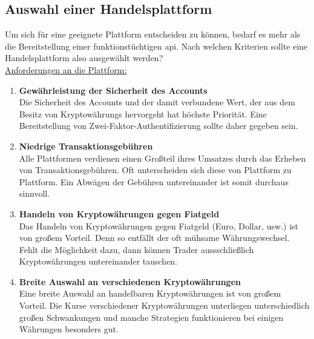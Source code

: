 \documentclass[oneside]{ausarbeitung}
\begin{document}
\subsection{Auswahl einer Handelsplattform}
\label{sub:auswahl_plattform}

Um sich für eine geeignete Plattform entscheiden zu können, bedarf
es mehr als die Bereitstellung einer funktionstüchtigen \ac{api}.
Nach welchen Kriterien sollte eine Handelsplattform also ausgewählt
werden? \\

\underline{Anforderungen an die Plattform:}
\begin{enumerate}
	\item \textbf{Gewährleistung der Sicherheit des Accounts} \\
		Die Sicherheit des Accounts und der damit 
		verbundene Wert, der aus dem Besitz von Kryptowährungs hervorgeht hat
		höchste Priorität. Eine Bereitstellung von Zwei-Faktor-Authentifizierung
		sollte daher gegeben sein.
	\item \textbf{Niedrige Transaktionsgebühren} \\
		Alle Plattformen verdienen einen Großteil ihres Umsatzes durch das
		Erheben von Transaktionsgebühren. Oft unterscheiden sich diese von
		Plattform zu Plattform. Ein Abwägen der Gebühren untereinander ist
		somit durchaus sinnvoll.
	\item \textbf{Handeln von Kryptowährungen gegen Fiatgeld} \\
		Das Handeln von Kryptowährungen gegen Fiatgeld (Euro, Dollar, usw.)
		ist von großem Vorteil. Denn so entfällt der oft mühsame Währungswechsel. 
		Fehlt die Möglichkeit dazu, dann können Trader aussschließlich
		Kryptowährungen untereinander tauschen.
	\item \textbf{Breite Auswahl an verschiedenen Kryptowährungen} \\
		Eine breite Auswahl an handelbaren Kryptowährungen ist von großem
		Vorteil. Die Kurse verschiedener Kryptowährungen unterliegen
		unterschiedlich großen Schwankungen und manche Strategien funktionieren
		bei einigen Währungen besonders gut. \\
\end{enumerate}
\end{document}
